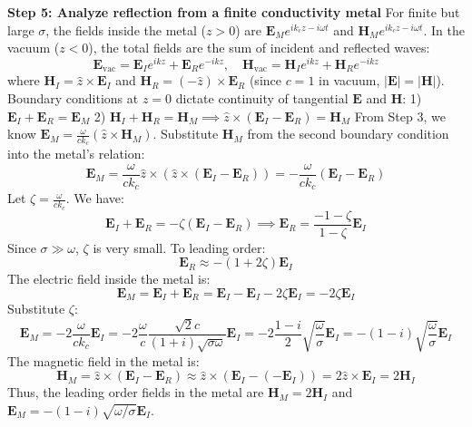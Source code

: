 \begin{solution}
\textbf{Step 5: Analyze reflection from a finite conductivity metal}
For finite but large $\sigma$, the fields inside the metal ($z>0$) are $\mathbf{E}_M e^{ik_c z - i\omega t}$ and $\mathbf{H}_M e^{ik_c z - i\omega t}$.
In the vacuum ($z<0$), the total fields are the sum of incident and reflected waves:
\[ \mathbf{E}_{\text{vac}} = \mathbf{E}_I e^{ikz} + \mathbf{E}_R e^{-ikz}, \quad \mathbf{H}_{\text{vac}} = \mathbf{H}_I e^{ikz} + \mathbf{H}_R e^{-ikz} \]
where $\mathbf{H}_I = \hat{z} \times \mathbf{E}_I$ and $\mathbf{H}_R = (-\hat{z}) \times \mathbf{E}_R$ (since $c=1$ in vacuum, $|\mathbf{E}| = |\mathbf{H}|$).
Boundary conditions at $z=0$ dictate continuity of tangential $\mathbf{E}$ and $\mathbf{H}$:
1) $\mathbf{E}_I + \mathbf{E}_R = \mathbf{E}_M$
2) $\mathbf{H}_I + \mathbf{H}_R = \mathbf{H}_M \implies \hat{z} \times (\mathbf{E}_I - \mathbf{E}_R) = \mathbf{H}_M$
From Step 3, we know $\mathbf{E}_M = \frac{\omega}{c k_c} (\hat{z} \times \mathbf{H}_M)$.
Substitute $\mathbf{H}_M$ from the second boundary condition into the metal's relation:
\[ \mathbf{E}_M = \frac{\omega}{c k_c} \hat{z} \times (\hat{z} \times (\mathbf{E}_I - \mathbf{E}_R)) = -\frac{\omega}{c k_c} (\mathbf{E}_I - \mathbf{E}_R) \]
Let $\zeta = \frac{\omega}{c k_c}$. We have:
\[ \mathbf{E}_I + \mathbf{E}_R = -\zeta (\mathbf{E}_I - \mathbf{E}_R) \implies \mathbf{E}_R = \frac{-1 - \zeta}{1 - \zeta} \mathbf{E}_I \]
Since $\sigma \gg \omega$, $\zeta$ is very small. To leading order:
\[ \mathbf{E}_R \approx -(1 + 2\zeta) \mathbf{E}_I \]
The electric field inside the metal is:
\[ \mathbf{E}_M = \mathbf{E}_I + \mathbf{E}_R = \mathbf{E}_I - \mathbf{E}_I - 2\zeta \mathbf{E}_I = -2\zeta \mathbf{E}_I \]
Substitute $\zeta$:
\[ \mathbf{E}_M = -2 \frac{\omega}{c k_c} \mathbf{E}_I = -2 \frac{\omega}{c} \frac{\sqrt{2} c}{(1+i)\sqrt{\sigma\omega}} \mathbf{E}_I = -2 \frac{1-i}{2} \sqrt{\frac{\omega}{\sigma}} \mathbf{E}_I = -(1-i) \sqrt{\frac{\omega}{\sigma}} \mathbf{E}_I \]
The magnetic field in the metal is:
\[ \mathbf{H}_M = \hat{z} \times (\mathbf{E}_I - \mathbf{E}_R) \approx \hat{z} \times (\mathbf{E}_I - (-\mathbf{E}_I)) = 2 \hat{z} \times \mathbf{E}_I = 2 \mathbf{H}_I \]
Thus, the leading order fields in the metal are $\mathbf{H}_M = 2 \mathbf{H}_I$ and $\mathbf{E}_M = -(1-i) \sqrt{\omega/\sigma} \mathbf{E}_I$.
\end{solution}

